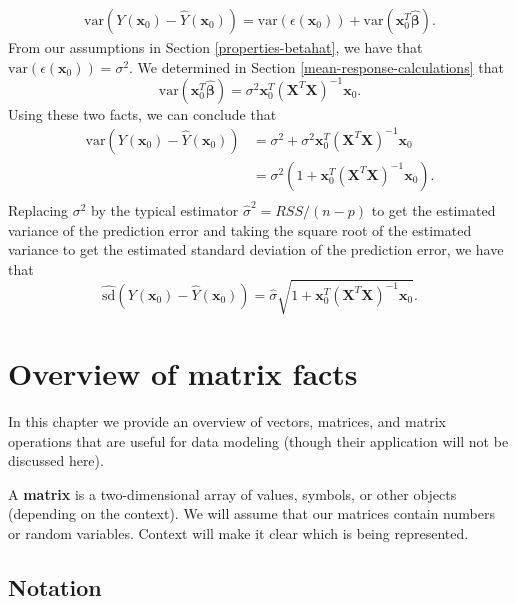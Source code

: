 \documentclass[
]{book}
\theoremstyle{definition}
\theoremstyle{definition}
\theoremstyle{definition}
\theoremstyle{definition}
\theoremstyle{remark}
\begin{document}
\[
\begin{aligned}
\mathrm{var}\left(Y(\mathbf{x}_0)-\hat{Y}(\mathbf{x}_0)\right) 
=\mathrm{var}\left(\epsilon(\mathbf{x}_0)\right)+\mathrm{var}(\mathbf{x}_0^T \hat{\boldsymbol{\beta}}) .
\end{aligned}
\label{eq:var-pred-error4}
\]
From our assumptions in Section \ref{properties-betahat}, we have that \(\mathrm{var}(\epsilon(\mathbf{x}_0))=\sigma^2\). We determined in Section \ref{mean-response-calculations} that
\[
\mathrm{var}(\mathbf{x}_0^T\hat{\boldsymbol{\beta}})=\sigma^2 \mathbf{x}_0^T (\mathbf{X}^T \mathbf{X})^{-1}\mathbf{x}_0.
\]
Using these two facts, we can conclude that
\[
\begin{aligned}
\mathrm{var}\left(Y(\mathbf{x}_0)-\hat{Y}(\mathbf{x}_0)\right) 
&=\sigma^2 + \sigma^2 \mathbf{x}_0^T (\mathbf{X}^T \mathbf{X})^{-1}\mathbf{x}_0\\
&=\sigma^2\left(1 + \mathbf{x}_0^T (\mathbf{X}^T \mathbf{X})^{-1}\mathbf{x}_0\right).\\
\end{aligned}
\label{eq:var-pred-error5}
\]
Replacing \(\sigma^2\) by the typical estimator \(\hat{\sigma}^2=RSS/(n-p)\) to get the estimated variance of the prediction error and taking the square root of the estimated variance to get the estimated standard deviation of the prediction error, we have that
\[
\widehat{\mathrm{sd}}\left(Y(\mathbf{x}_0)-\hat{Y}(\mathbf{x}_0)\right) = \hat{\sigma}\sqrt{1 + \mathbf{x}_0^T (\mathbf{X}^T \mathbf{X})^{-1}\mathbf{x}_0}.
\]

\hypertarget{appendix-appendix}{%
\appendix}


\hypertarget{overview-of-matrix-facts}{%
\chapter{Overview of matrix facts}\label{overview-of-matrix-facts}}

In this chapter we provide an overview of vectors, matrices, and matrix operations that are useful for data modeling (though their application will not be discussed here).

A \textbf{matrix} is a two-dimensional array of values, symbols, or other objects (depending on the context). We will assume that our matrices contain numbers or random variables. Context will make it clear which is being represented.

\hypertarget{notation}{%
\section{Notation}\label{notation}}
\end{document}
